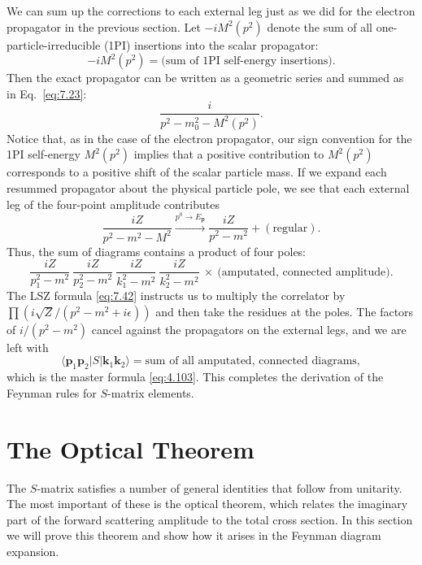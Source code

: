 We can sum up the corrections to each external leg just as we did for the
electron propagator in the previous section.  Let $-iM^2(p^2)$ denote the sum
of all one-particle-irreducible (1PI) insertions into the scalar propagator:
\begin{equation}
  -iM^2(p^2) = \text{(sum of 1PI self-energy insertions)} .
\end{equation}
Then the exact propagator can be written as a geometric series and summed as
in Eq.~\eqref{eq:7.23}:
\begin{equation}
  \frac{i}{p^2-m_0^2-M^2(p^2)} .
  \label{eq:7.43}
\end{equation}
Notice that, as in the case of the electron propagator, our sign convention
for the 1PI self-energy $M^2(p^2)$ implies that a positive contribution to
$M^2(p^2)$ corresponds to a positive shift of the scalar particle mass.  If we
expand each resummed propagator about the physical particle pole, we see that
each external leg of the four-point amplitude contributes
\begin{equation}
  \frac{iZ}{p^2-m^2-M^2} \xrightarrow{p^0\to E_{\mathbf{p}}}
    \frac{iZ}{p^2-m^2} + (\text{regular}) .
  \label{eq:7.44}
\end{equation}
Thus, the sum of diagrams contains a product of four poles:
\begin{equation}
  \frac{iZ}{p_1^2-m^2}\ \frac{iZ}{p_2^2-m^2}\ \frac{iZ}{k_1^2-m^2}\
    \frac{iZ}{k_2^2-m^2}\ \times\ \text{(amputated, connected amplitude)} .
\end{equation}
The LSZ formula \eqref{eq:7.42} instructs us to multiply the correlator by
$\prod (i\sqrt{Z}/(p^2-m^2+i\epsilon))$ and then take the residues at the
poles.  The factors of $i/(p^2-m^2)$ cancel against the propagators on the
external legs, and we are left with
\begin{equation}
  \langle\mathbf{p}_1\mathbf{p}_2|S|\mathbf{k}_1\mathbf{k}_2\rangle
  = \text{sum of all amputated, connected diagrams},
  \label{eq:7.45}
\end{equation}
which is the master formula \eqref{eq:4.103}.  This completes the derivation
of the Feynman rules for $S$-matrix elements.

\section{The Optical Theorem}

The $S$-matrix satisfies a number of general identities that follow from
unitarity.  The most important of these is the optical theorem, which relates
the imaginary part of the forward scattering amplitude to the total cross
section.  In this section we will prove this theorem and show how it arises in
the Feynman diagram expansion.

